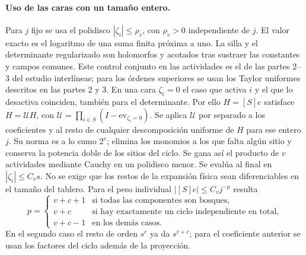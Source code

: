 \paragraph{Uso de las caras con un tamaño entero.}
Para $j$ fijo se usa el polidisco $|\zeta_i|\le\rho_v$, con $\rho_v>0$ independiente de $j$.
El valor exacto es el logaritmo de una suma finita próxima a uno. La silla y el determinante
regularizado son holomorfos y acotados tras sustraer las constantes y campos comunes.
Este control conjunto en las actividades es el de las partes 2--3 del estudio interlíneas;
para los órdenes superiores se usan los Taylor uniformes descritos en las partes 2 y 3.
En una cara $\zeta_i=0$ el caso que activa $i$ y el que lo desactiva coinciden,
también para el determinante. Por ello $H=[S]e$ satisface
$H=\mathcal U H$, con $\mathcal U=\prod_{i\in S}(I-\mathrm{ev}_{\zeta_i=0})$.
Se aplica $\mathcal U$ por separado a los coeficientes y al resto de cualquier
descomposición uniforme de $H$ para ese entero $j$. Su norma es a lo sumo $2^v$;
elimina los monomios a los que falta algún sitio y conserva la potencia doble de los
sitios del ciclo. Se gana así el producto de $v$ actividades mediante Cauchy en un
polidisco menor. Se evalúa al final en $|\zeta_i|\le C_v s$. No se exige que los restos
de la expansión física sean diferenciables en el tamaño del tablero.
Para el peso individual $|[S]e|\le C_v j^{-p}$ resulta
\[
 p=\begin{cases}
 v+c+1 & \text{si todas las componentes son bosques},\\
 v+c   & \text{si hay exactamente un ciclo independiente en total},\\
 v+c-1 & \text{en los demás casos}.
 \end{cases}
\]
En el segundo caso el resto de orden $s^c$ ya da $s^{v+c}$; para el coeficiente
anterior se usan los factores del ciclo además de la proyección.
